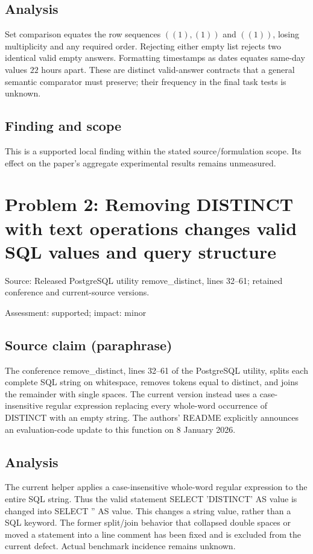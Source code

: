 \documentclass[11pt]{article}
\begin{document}
\subsection*{Analysis}

Set comparison equates the row sequences \(((1),(1))\) and \(((1))\), losing multiplicity and any required order. Rejecting either empty list rejects two identical valid empty answers. Formatting timestamps as dates equates same-day values \(22\) hours apart. These are distinct valid-answer contracts that a general semantic comparator must preserve; their frequency in the final task tests is unknown.

\subsection*{Finding and scope}

This is a supported local finding within the stated source/formulation scope. Its effect on the paper's aggregate experimental results remains unmeasured.

\section*{Problem 2: Removing DISTINCT with text operations changes valid SQL values and query structure}

Source: Released PostgreSQL utility remove\_distinct, lines 32–61; retained conference and current-source versions.

Assessment: supported; impact: minor

\subsection*{Source claim (paraphrase)}

The conference remove\_distinct, lines 32–61 of the PostgreSQL utility, splits each complete SQL string on whitespace, removes tokens equal to distinct, and joins the remainder with single spaces. The current version instead uses a case-insensitive regular expression replacing every whole-word occurrence of DISTINCT with an empty string. The authors’ README explicitly announces an evaluation-code update to this function on \(8\) January 2026.

\subsection*{Analysis}

The current helper applies a case-insensitive whole-word regular expression to the entire SQL string. Thus the valid statement SELECT 'DISTINCT' AS value is changed into SELECT '' AS value. This changes a string value, rather than a SQL keyword. The former split/join behavior that collapsed double spaces or moved a statement into a line comment has been fixed and is excluded from the current defect. Actual benchmark incidence remains unknown.
\end{document}

